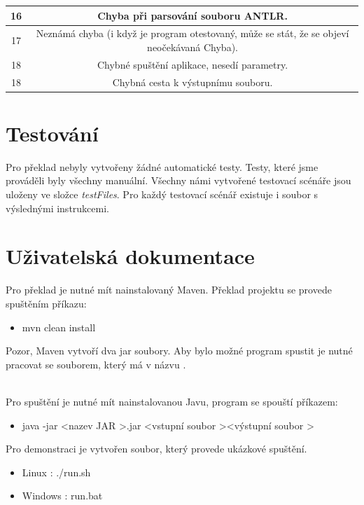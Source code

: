 \documentclass[12pt, a4paper]{article}
\begin{document}
\begin{table}[!h]
{\begin{tabular}{|c|c|}
16  & Chyba při parsování souboru ANTLR.                                                                 \\ \hline
17  & Neznámá chyba (i když je program otestovaný, může se stát, že se objeví neočekávaná Chyba).										  									                                                                \\ \hline
18  & Chybné spuštění aplikace, nesedí parametry.                                                        \\ \hline
18  & Chybná cesta k výstupnímu souboru.                                                        \\ \hline
\end{tabular}%
}
\end{table}
\newpage
\section{Testování}
\noindent Pro překlad nebyly vytvořeny žádné automatické testy. Testy, které jsme prováděli byly všechny manuální. Všechny námi vytvořené testovací scénáře jsou uloženy ve složce \textit{testFiles}. Pro každý testovací scénář existuje i soubor s výslednými instrukcemi.

\section{Uživatelská dokumentace}
\noindent Pro překlad je nutné mít nainstalovaný \textsf{Maven}. Překlad projektu se provede spuštěním příkazu:
\begin{itemize}
	\item mvn clean install
\end{itemize}

\noindent Pozor, \textsf{Maven} vytvoří dva jar soubory. Aby bylo možné program spustit je nutné pracovat se souborem, který má v názvu .

\mbox{}\\
\noindent Pro spuštění je nutné mít nainstalovanou \textsf{Javu}, program se spouští příkazem:

\begin{itemize}
	\item java -jar \textless nazev JAR \textgreater.jar \textless vstupní soubor \textgreater \textvisiblespace \textless výstupní soubor \textgreater
\end{itemize}

\noindent Pro demonstraci je vytvořen soubor, který provede ukázkové spuštění.
\begin{itemize}
  \item Linux : ./run.sh
  \item Windows : run.bat
\end{itemize}
\end{document}
